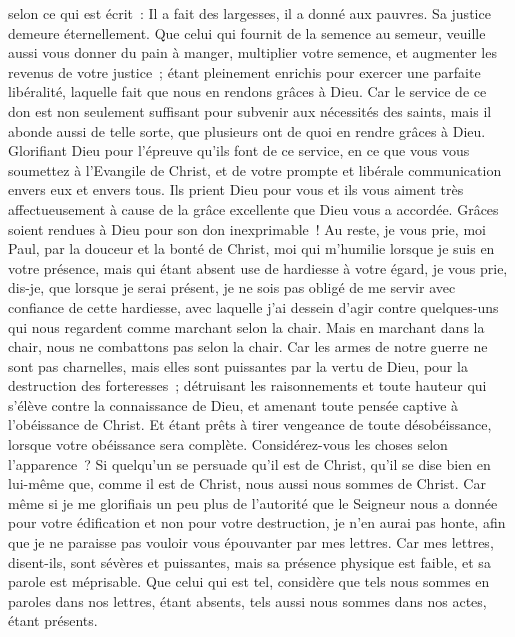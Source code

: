 \begin{multicols}{2}
selon ce qui est écrit~: Il a fait des largesses, il a donné aux pauvres. Sa justice demeure éternellement.
Que celui qui fournit de la semence au semeur, veuille aussi vous donner du pain à manger, multiplier votre semence, et augmenter les revenus de votre justice~;
étant pleinement enrichis pour exercer une parfaite libéralité, laquelle fait que nous en rendons grâces à Dieu.
Car le service de ce don est non seulement suffisant pour subvenir aux nécessités des saints, mais il abonde aussi de telle sorte, que plusieurs ont de quoi en rendre grâces à Dieu.
Glorifiant Dieu pour l'épreuve qu'ils font de ce service, en ce que vous vous soumettez à l'Evangile de Christ, et de votre prompte et libérale communication envers eux et envers tous.
Ils prient Dieu pour vous et ils vous aiment très affectueusement à cause de la grâce excellente que Dieu vous a accordée.
Grâces soient rendues à Dieu pour son don inexprimable~!
\VerseOne{}Au reste, je vous prie, moi Paul, par la douceur et la bonté de Christ, moi qui m'humilie lorsque je suis en votre présence, mais qui étant absent use de hardiesse à votre égard,
je vous prie, dis-je, que lorsque je serai présent, je ne sois pas obligé de me servir avec confiance de cette hardiesse, avec laquelle j'ai dessein d'agir contre quelques-uns qui nous regardent comme marchant selon la chair.
Mais en marchant dans la chair, nous ne combattons pas selon la chair.
Car les armes de notre guerre ne sont pas charnelles, mais elles sont puissantes par la vertu de Dieu, pour la destruction des forteresses~;
détruisant les raisonnements et toute hauteur qui s'élève contre la connaissance de Dieu, et amenant toute pensée captive à l'obéissance de Christ.
Et étant prêts à tirer vengeance de toute désobéissance, lorsque votre obéissance sera complète.
Considérez-vous les choses selon l'apparence~? Si quelqu'un se persuade qu'il est de Christ, qu'il se dise bien en lui-même que, comme il est de Christ, nous aussi nous sommes de Christ.
Car même si je me glorifiais un peu plus de l'autorité que le Seigneur nous a donnée pour votre édification et non pour votre destruction, je n'en aurai pas honte,
afin que je ne paraisse pas vouloir vous épouvanter par mes lettres.
Car mes lettres, disent-ils, sont sévères et puissantes, mais sa présence physique est faible, et sa parole est méprisable.
Que celui qui est tel, considère que tels nous sommes en paroles dans nos lettres, étant absents, tels aussi nous sommes dans nos actes, étant présents.

\end{multicols}

